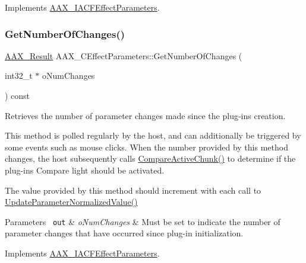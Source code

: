 Implements \mbox{\hyperlink{a01669_a1e86f849e970c9998313fc7d451ccf85}{A\+A\+X\+\_\+\+I\+A\+C\+F\+Effect\+Parameters}}.

\mbox{\label{a01481_a9c6e26d6b3e028fcb048e01caa155f65}} 
\subsubsection{\texorpdfstring{GetNumberOfChanges()}{GetNumberOfChanges()}}
{\footnotesize\ttfamily \mbox{\hyperlink{a00392_a4d8f69a697df7f70c3a8e9b8ee130d2f}{A\+A\+X\+\_\+\+Result}} A\+A\+X\+\_\+\+C\+Effect\+Parameters\+::\+Get\+Number\+Of\+Changes (\begin{DoxyParamCaption}\item[{int32\+\_\+t $\ast$}]{o\+Num\+Changes }\end{DoxyParamCaption}) const\hspace{0.3cm}{\ttfamily [virtual]}}



Retrieves the number of parameter changes made since the plug-\/in\textquotesingle{}s creation. 

This method is polled regularly by the host, and can additionally be triggered by some events such as mouse clicks. When the number provided by this method changes, the host subsequently calls \mbox{\hyperlink{a01481_a514644d855be6f58043ec165f6ce8ddb}{Compare\+Active\+Chunk()}} to determine if the plug-\/in\textquotesingle{}s Compare light should be activated.

The value provided by this method should increment with each call to \mbox{\hyperlink{a01669_a685858711efb8634ce66c327f2865c71}{Update\+Parameter\+Normalized\+Value()}}


\begin{DoxyParams}[1]{Parameters}
\mbox{\texttt{ out}}  & {\em o\+Num\+Changes} & Must be set to indicate the number of parameter changes that have occurred since plug-\/in initialization. \\
\hline
\end{DoxyParams}


Implements \mbox{\hyperlink{a01669_a17b96da201d9a242d3662e87525a7227}{A\+A\+X\+\_\+\+I\+A\+C\+F\+Effect\+Parameters}}.

\mbox{\label{a01481_a4e1dc0e4b966fe80041d67814d13e03d}} 
